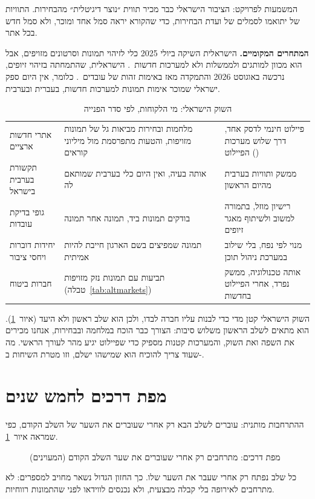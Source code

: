 המשמעות לפרויקט: הציבור הישראלי כבר מכיר תווית ״נוצר דיגיטלית״ מהבחירות. התוויות של  יתואמו לסמלים של ועדת הבחירות, כדי שהקורא יראה סמל אחד ומוכר, ולא סמל חדש בכל אתר.

\textbf{המתחרים המקומיים.}  הישראלית השיקה ביולי \num{2025} כלי לזיהוי תמונות וסרטונים מזויפים, אבל הוא מכוון למותגים ולממשלות ולא למערכות חדשות~\cite{cyabra2025}.  הישראלית, שהתמחתה בזיהוי זיופים, נרכשה באוגוסט \num{2026} והתמקדה מאז באימות זהות של עובדים~\cite{clarity2026}. כלומר, אין היום ספק ישראלי שמוכר אימות תמונות למערכות חדשות, בעברית ובערבית.

\begin{table}[!htb]\centering
\caption{השוק הישראלי: מי הלקוחות, לפי סדר הפנייה}\label{tab:israel}
\small
\begin{tabularx}{\linewidth}{@{}l Y Y@{}}
\toprule
{} &  &  \\
\midrule
אתרי חדשות ארציים & מלחמות ובחירות מביאות גל של תמונות מזויפות, והטעות מתפרסמת מול מיליוני קוראים & פיילוט חינמי לדסק אחד, דרך שלוש מערכות הפיילוט () \\
תקשורת בערבית בישראל & אותה בעיה, ואין היום כלי בערבית שמותאם לה & ממשק ותוויות בערבית מהיום הראשון \\
גופי בדיקת עובדות & בודקים תמונות ביד, תמונה אחר תמונה & רישיון מוזל, בתמורה למשוב ולשיתוף מאגר זיופים \\
יחידות דוברות ויחסי ציבור & תמונה שמפיצים בשם הארגון חייבת להיות אמיתית & מנוי לפי נפח, בלי שילוב במערכת ניהול תוכן \\
חברות ביטוח & תביעות עם תמונות נזק מזויפות (טבלה~\ref{tab:altmarkets}) & אותה טכנולוגיה, ממשק נפרד, אחרי הפיילוט בחדשות \\
\bottomrule
\end{tabularx}
\end{table}

השוק הישראלי קטן מדי כדי לבנות עליו חברה לבדו, ולכן הוא שלב ראשון ולא היעד (איור~\ref{fig:roadmap}). הוא מתאים לשלב הראשון משלוש סיבות: הצורך כבר הוכח במלחמה ובבחירות, אנחנו מכירים את השפה ואת השוק, והמערכות קטנות מספיק כדי שפיילוט יגיע מהר לעורך הראשי. מה שעוד צריך להוכיח הוא שמישהו ישלם, וזו מטרת השיחות ב-.

\section{מפת דרכים לחמש שנים}

ההתרחבות מותנית: עוברים לשלב הבא רק אחרי שעוברים את השער של השלב הקודם, כפי שמראה איור~\ref{fig:roadmap}.

\begin{figure}[!htb]
\begin{ltrdiagram}

\end{ltrdiagram}
\caption{מפת דרכים: מתרחבים רק אחרי שעוברים את שער השלב הקודם (המעוינים)}\label{fig:roadmap}
\end{figure}

כל שלב נפתח רק אחרי שעבר את השער שלו. כך החזון הגדול נשאר מחויב למספרים: לא מתרחבים לאירופה בלי קבלה מבצעית, ולא נכנסים לווידאו לפני שהתמונות רווחיות.
